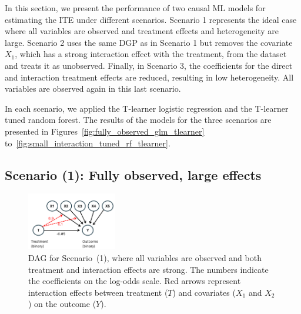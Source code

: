 In this section, we present the performance of two causal ML models for estimating the ITE under different scenarios. Scenario 1 represents the ideal case where all variables are observed and treatment effects and heterogeneity are large. Scenario 2 uses the same DGP as in Scenario 1 but removes the covariate $X_1$, which has a strong interaction effect with the treatment, from the dataset and treats it as unobserved. Finally, in Scenario 3, the coefficients for the direct and interaction treatment effects are reduced, resulting in low heterogeneity. All variables are observed again in this last scenario. 

In each scenario, we applied the T-learner logistic regression and the T-learner tuned random forest. The results of the models for the three scenarios are presented in Figures~\ref{fig:fully_observed_glm_tlearner} to~\ref{fig:small_interaction_tuned_rf_tlearner}.


\subsection{Scenario (1): Fully observed, large effects}



\begin{figure}[htbp]
\centering
\includegraphics[width=0.35\textwidth]{img/results_ITE_simulation/simulation_observed.png}
\caption{DAG for Scenario~(1), where all variables are observed and both treatment and interaction effects are strong. The numbers indicate the coefficients on the log-odds scale. Red arrows represent interaction effects between treatment ($T$) and covariates ($X_1$ and $X_2$) on the outcome ($Y$).}
\label{fig:fully_observed_dag}
\end{figure}


